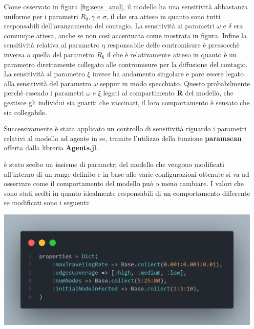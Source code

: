 Come osservato in figura \ref{fig:sens_anal}, il modello ha una sensitività abbastanza 
uniforme per i parametri $R_0, \gamma$ e $\sigma$, il che era atteso in quanto sono tutti 
responsabili dell'avanzamento del contagio. La sensitività ai parametri $\omega$ e $\delta$ 
era comunque attesa, anche se non così accentuata come mostrata in figura. Infine la sensitività 
relativa al parametro $\eta$ responsabile delle contromisure è pressocchè inversa a quella del 
parametro $R_0$ il che è relativamente atteso in quanto è un parametro direttamente collegato 
alle contromisure per la diffusione del contagio. La sensitività al parametro $\xi$ invece ha 
andamento singolare e pare essere legato alla sensitività del parametro $\omega$ seppur in 
modo specchiato. Questo probabilmente perchè essendo i parametri $\omega$ e $\xi$ legati al 
compartimento \textbf{R} del modello, che gestisce gli individui sia guariti che vaccinati, 
il loro comportamento è sensato che sia collegabile.

Successivamente è stata applicato un controllo di sensitività riguardo i parametri 
relativi al modello ad agente in se, tramite l'utilizzo della funzione \textbf{paramscan} offerta
dalla libreria \textbf{Agents.jl}.

è stato scelto un insieme di parametri del modello che vengono modificati all'interno di un range 
definito e in base alle varie configurazioni ottenute si va ad osservare come il comportamento del modello 
può o meno cambiare. I valori che sono stati scelti in quanto idealmente responsabili di un comportamento 
differente se modificati sono i seguenti: 

\begin{minipage}{\linewidth}
	\centering
	\includegraphics[width=\textwidth]{img/paramscan.png}
	\label{fig:paramscan}
\end{minipage}

